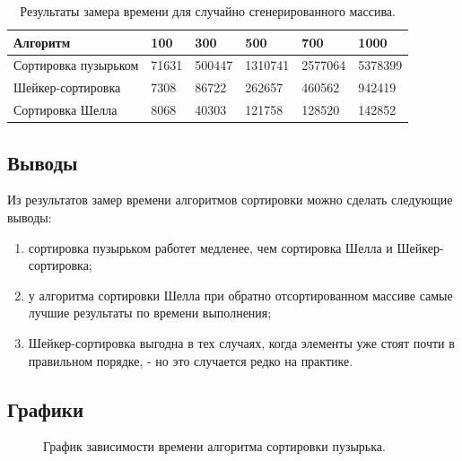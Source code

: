\documentclass[a4paper]{article}
\begin{document}
\begin{table}[h]
	\caption{\label{table3} Результаты замера времени для случайно сгенерированного массива.}
	\begin{center}
		\begin{tabular}{|p{200pt}|p{50pt}|p{50pt}|p{50pt}|p{50pt} |p{50pt}|}
			\hline
			\textbf{Алгоритм} & \textbf{100} & \textbf{300} &\textbf{500} & \textbf{700} & \textbf{1000}\\ \hline
			Сортировка пузырьком & 71631 & 500447 & 1310741 & 2577064 & 5378399 \\	\hline
			Шейкер-сортировка & 7308 &86722 & 262657 & 460562 &  942419\\ \hline
			Сортировка Шелла & 8068 & 40303 & 121758 &128520 & 142852\\ \hline
		\end{tabular}
	\end{center}
\end{table}

\clearpage

\subsection{Выводы}
Из результатов замер времени алгоритмов сортировки можно сделать следующие выводы:
\begin{enumerate}
	\item сортировка пузырьком работет медленее, чем сортировка Шелла и Шейкер-сортировка;
	\item у алгоритма сортировки Шелла при обратно отсортированном массиве самые лучшие результаты по времени выполнения;
	\item Шейкер-сортировка выгодна в тех случаях, когда элементы уже стоят почти в правильном порядке, - но это случается редко на практике.\cite{nikvirt}
\end{enumerate}
\clearpage

\subsection{Графики}
\begin{figure}[h]
	\caption{График зависимости времени алгоритма сортировки пузырька. \centering}
	\label{image5}
\end{figure}
\end{document}
